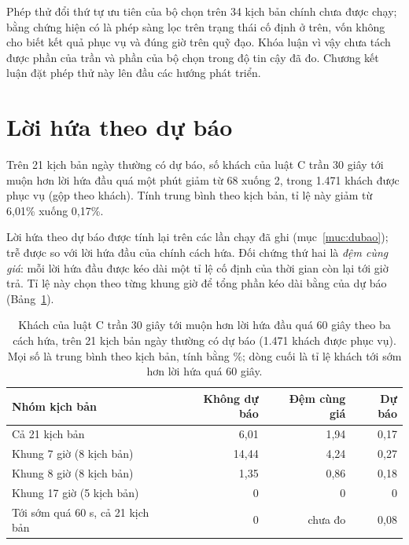 Phép thử đổi thứ tự ưu tiên của bộ chọn trên 34 kịch bản chính chưa được chạy; bằng chứng hiện có là phép sàng lọc
trên trạng thái cố định ở trên, vốn không cho biết kết quả phục vụ và đúng giờ trên quỹ đạo. Khóa luận vì vậy chưa
tách được phần của trần và phần của bộ chọn trong độ tin cậy đã đo. Chương kết luận đặt phép thử này lên đầu các hướng
phát triển.

\section{Lời hứa theo dự báo}
\label{muc:c4-dubao}

Trên 21 kịch bản ngày thường có dự báo, số khách của luật C trần 30 giây tới muộn hơn lời hứa đầu quá một phút
giảm từ 68 xuống 2, trong 1.471 khách được phục vụ (gộp theo khách). Tính trung bình theo kịch bản, tỉ lệ này giảm
từ 6,01\% xuống 0,17\%.

Lời hứa theo dự báo được tính lại trên các lần chạy đã ghi (mục~\ref{muc:dubao}); trễ được so với lời hứa đầu của
chính cách hứa. Đối chứng thứ hai là \emph{đệm cùng giá}: mỗi lời hứa đầu được kéo dài một tỉ lệ cố định của thời
gian còn lại tới giờ trả. Tỉ lệ này chọn theo từng khung giờ để tổng phần kéo dài bằng của dự báo
(Bảng~\ref{bang:c4-dubao}).

\begin{table}[htbp]
\centering
\caption{Khách của luật C trần 30 giây tới muộn hơn lời hứa đầu quá 60 giây theo ba cách hứa, trên 21 kịch bản
ngày thường có dự báo (1.471 khách được phục vụ). Mọi số là trung bình theo kịch bản, tính bằng \%; dòng cuối là
tỉ lệ khách tới sớm hơn lời hứa quá 60 giây.}
\label{bang:c4-dubao}
\small
\begin{tabular}{@{}lrrr@{}}
\toprule
\textbf{Nhóm kịch bản} & \textbf{Không dự báo} & \textbf{Đệm cùng giá} & \textbf{Dự báo}\\
\midrule
Cả 21 kịch bản & 6,01 & 1,94 & 0,17\\
Khung 7 giờ (8 kịch bản) & 14,44 & 4,24 & 0,27\\
Khung 8 giờ (8 kịch bản) & 1,35 & 0,86 & 0,18\\
Khung 17 giờ (5 kịch bản) & 0 & 0 & 0\\
\midrule
Tới sớm quá 60 s, cả 21 kịch bản & 0 & chưa đo & 0,08\\
\bottomrule
\end{tabular}
\end{table}

